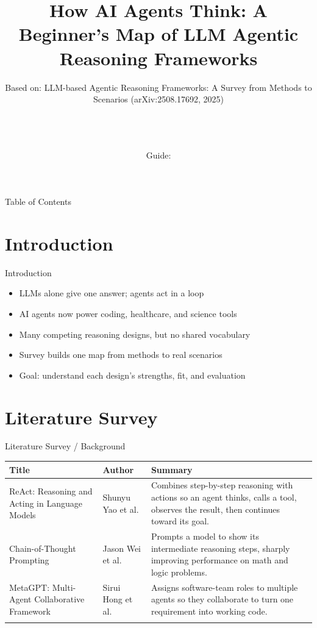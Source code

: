 \documentclass[10pt]{beamer}
\title[B.Tech Seminar]{How AI Agents Think: A Beginner's Map of LLM Agentic Reasoning Frameworks}
\subtitle{Based on: LLM-based Agentic Reasoning Frameworks: A Survey from Methods to Scenarios (arXiv:2508.17692, 2025)}
\author[\studentname\ (\shortinst)]{\studentname \\ \small \rollno \\ \small \rollclass \\ \small Guide: \guidename}
\institute[]{\deptname \\ \collegename}
\date{\seminardate}
\begin{document}
\begin{frame}[plain]
  \titlepage
\end{frame}

\begin{frame}{Table of Contents}
  \tableofcontents
\end{frame}

\section{Introduction}
\begin{frame}{Introduction}
\begin{itemize}
  \item LLMs alone give one answer; agents act in a loop
  \item AI agents now power coding, healthcare, and science tools
  \item Many competing reasoning designs, but no shared vocabulary
  \item Survey builds one map from methods to real scenarios
  \item Goal: understand each design's strengths, fit, and evaluation
\end{itemize}
\end{frame}

\section{Literature Survey}
\begin{frame}{Literature Survey / Background}
  \small
  \begin{tabular}{@{}p{2.7cm}p{2.3cm}p{5.6cm}@{}}
    \toprule
    \textbf{Title} & \textbf{Author} & \textbf{Summary} \\
    \midrule
    ReAct: Reasoning and Acting in Language Models & Shunyu Yao et al. & Combines step-by-step reasoning with actions so an agent thinks, calls a tool, observes the result, then continues toward its goal. \\
    \addlinespace
    Chain-of-Thought Prompting & Jason Wei et al. & Prompts a model to show its intermediate reasoning steps, sharply improving performance on math and logic problems. \\
    \addlinespace
    MetaGPT: Multi-Agent Collaborative Framework & Sirui Hong et al. & Assigns software-team roles to multiple agents so they collaborate to turn one requirement into working code. \\
    \addlinespace
    \bottomrule
  \end{tabular}
\end{frame}
\end{document}
